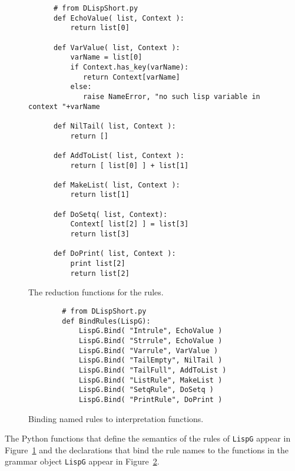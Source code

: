 \begin{figure}
\begin{center}
\begin{verbatim}
      # from DLispShort.py
      def EchoValue( list, Context ):
          return list[0]
      
      def VarValue( list, Context ):
          varName = list[0]
          if Context.has_key(varName):
             return Context[varName]
          else:
             raise NameError, "no such lisp variable in context "+varName
      
      def NilTail( list, Context ):
          return []
      
      def AddToList( list, Context ):
          return [ list[0] ] + list[1]
      
      def MakeList( list, Context ):
          return list[1]
      
      def DoSetq( list, Context):
          Context[ list[2] ] = list[3]
          return list[3]
      
      def DoPrint( list, Context ):
          print list[2]
          return list[2]
\end{verbatim}
\end{center}
\caption{The reduction functions for the rules. \label{RedFun} }
\end{figure}


\begin{figure}
\begin{center}
\begin{verbatim}
        # from DLispShort.py
        def BindRules(LispG):
            LispG.Bind( "Intrule", EchoValue )
            LispG.Bind( "Strrule", EchoValue )
            LispG.Bind( "Varrule", VarValue )
            LispG.Bind( "TailEmpty", NilTail )
            LispG.Bind( "TailFull", AddToList )
            LispG.Bind( "ListRule", MakeList )
            LispG.Bind( "SetqRule", DoSetq )
            LispG.Bind( "PrintRule", DoPrint )
\end{verbatim}
\end{center}
\caption{Binding named rules to interpretation functions. \label{ruleBind} }
\end{figure}

The Python functions that define the semantics of the rules of
{\tt LispG} appear in Figure~\ref{RedFun} and the declarations
that bind the rule names to the functions in the grammar object
{\tt LispG} appear in Figure~\ref{ruleBind}.

